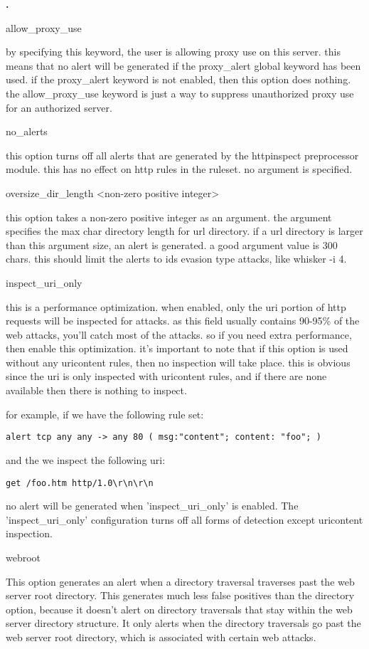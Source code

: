 \documentclass[english]{report}
\newcounter{slistnum}
\newenvironment{slist}{
    \begin{list}{
        {
            \bf \arabic{slistnum}.
        } 
    }{
        \usecounter{slistnum} 
    }
}{
    \end{list} 
}
\begin{document}
\begin{slist}
\item allow\_proxy\_use

by specifying this keyword, the user is allowing proxy use on this server.
this means that no alert will be generated if the proxy\_alert global keyword
has been used.  if the proxy\_alert keyword is not enabled, then this option
does nothing.  the allow\_proxy\_use keyword is just a way to suppress
unauthorized proxy use for an authorized server.  

\item no\_alerts

this option turns off all alerts that are generated by the httpinspect
preprocessor module.  this has no effect on http rules in the ruleset.  no
argument is specified.

\item oversize\_dir\_length <non-zero positive integer>

this option takes a non-zero positive integer as an argument.  the argument
specifies the max char directory length for url directory.  if a url directory
is larger than this argument size, an alert is generated.  a good argument
value is 300 chars.  this should limit the alerts to ids evasion type attacks,
like whisker -i 4.

\item inspect\_uri\_only

this is a performance optimization.  when enabled, only the uri portion of http
requests will be inspected for attacks.  as this field usually contains 90-95\%
of the web attacks, you'll catch most of the attacks.  so if you need extra
performance, then enable this optimization.  it's important to note that if
this option is used without any uricontent rules, then no inspection will take
place.  this is obvious since the uri is only inspected with uricontent rules,
and if there are none available then there is nothing to inspect.

for example, if we have the following rule set:

\begin{verbatim}
alert tcp any any -> any 80 ( msg:"content"; content: "foo"; )
\end{verbatim}

and the we inspect the following uri:
\begin{verbatim}
get /foo.htm http/1.0\r\n\r\n
\end{verbatim}

no alert will be generated when 'inspect\_uri\_only' is enabled.  The
'inspect\_uri\_only' configuration turns off all forms of detection except
uricontent inspection.

\item webroot

This option generates an alert when a directory traversal traverses past
the web server root directory.  This generates much less false positives than
the directory option, because it doesn't alert on directory traversals that
stay within the web server directory structure.  It only alerts when the
directory traversals go past the web server root directory, which
is associated with certain web attacks.

\end{slist}
\end{document}
